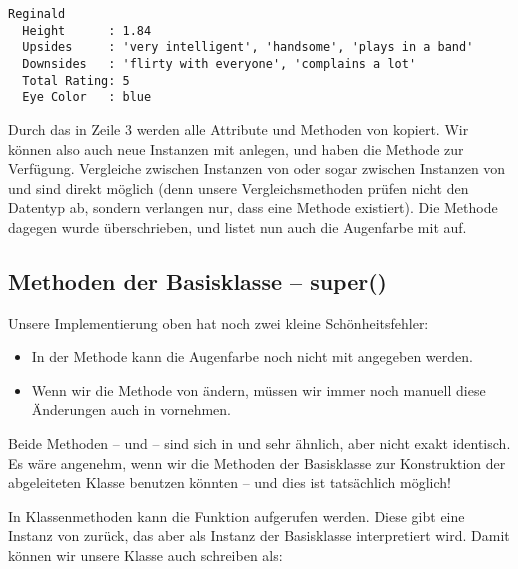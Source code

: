 \begin{cmdbox}
\begin{verbatim}
Reginald
  Height      : 1.84
  Upsides     : 'very intelligent', 'handsome', 'plays in a band'
  Downsides   : 'flirty with everyone', 'complains a lot'
  Total Rating: 5
  Eye Color   : blue
\end{verbatim}
\end{cmdbox}

Durch das  in Zeile 3 werden alle Attribute und Methoden von  kopiert. Wir können also auch neue Instanzen mit  anlegen, und haben die Methode  zur Verfügung. Vergleiche zwischen Instanzen von  oder sogar zwischen Instanzen von  und  sind direkt möglich (denn unsere Vergleichsmethoden prüfen nicht den Datentyp ab, sondern verlangen nur, dass eine Methode  existiert). Die Methode  dagegen wurde überschrieben, und listet nun auch die Augenfarbe mit auf.

\subsection{Methoden der Basisklasse -- super()}
Unsere Implementierung oben hat noch zwei kleine Schönheitsfehler:
\begin{itemize}
\item In der Methode  kann die Augenfarbe noch nicht mit angegeben werden.
\item Wenn wir die Methode  von  ändern, müssen wir immer noch manuell diese Änderungen auch in  vornehmen.
\end{itemize}
Beide Methoden --  und  -- sind sich in  und  sehr ähnlich, aber nicht exakt identisch. Es wäre angenehm, wenn wir die Methoden der Basisklasse zur Konstruktion der abgeleiteten Klasse benutzen könnten -- und dies ist tatsächlich möglich!

In Klassenmethoden kann die Funktion  aufgerufen werden. Diese gibt eine Instanz von  zurück, das aber als Instanz der Basisklasse interpretiert wird. Damit können wir unsere Klasse  auch schreiben als:

